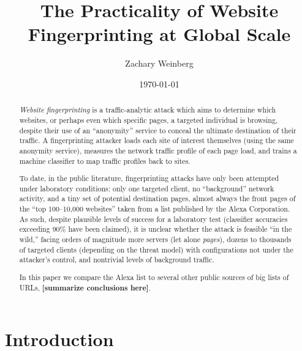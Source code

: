 \documentclass{zarticle}
\def\todo#1{{\color{todocolor}\bfseries [#1]}}
\begin{document}
\title{The Practicality of Website Fingerprinting at Global Scale}
\author{Zachary Weinberg}
\date{\today}
\maketitle

\begin{abstract}
\textit{Website fingerprinting} is a traffic-analytic attack which
aims to determine which websites, or perhaps even which specific
pages, a targeted individual is browsing, despite their use of an
“anonymity” service to conceal the ultimate destination of their
traffic.  A fingerprinting attacker loads each site of interest
themselves (using the same anonymity service), measures the network
traffic profile of each page load, and trains a machine classifier to
map traffic profiles back to sites.

To date, in the public literature, fingerprinting attacks have only
been attempted under laboratory conditions: only one targeted client,
no “background” network activity, and a tiny set of potential
destination pages, almost always the front pages of the “top
100--10,000 websites” taken from a list published by the Alexa
Corporation.  As such, despite plausible levels of success for a
laboratory test (classifier accuracies exceeding 90\% have been
claimed), it is unclear whether the attack is feasible “in the wild,”
facing orders of magnitude more servers (let alone \emph{pages}),
dozens to thousands of targeted clients (depending on the threat
model) with configurations not under the attacker's control, and
nontrivial levels of background traffic.

In this paper we compare the Alexa list to several other public
sources of big lists of URLs, \todo{summarize conclusions here}.
\end{abstract}

\section{Introduction}
\end{document}

